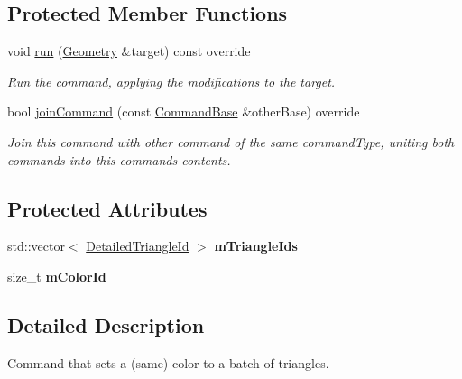 \subsection*{Protected Member Functions}
\begin{DoxyCompactItemize}
\item 
\mbox{\label{classpepr3d_1_1_cmd_paint_single_color_ab113e39f99d4763fa7a5b0d4839c06fc}} 
void \mbox{\hyperlink{classpepr3d_1_1_cmd_paint_single_color_ab113e39f99d4763fa7a5b0d4839c06fc}{run}} (\mbox{\hyperlink{classpepr3d_1_1_geometry}{Geometry}} \&target) const override
\begin{DoxyCompactList}\small\item\em Run the command, applying the modifications to the target. \end{DoxyCompactList}\item 
bool \mbox{\hyperlink{classpepr3d_1_1_cmd_paint_single_color_a99945a65b5efae3151ebdbae619f3eed}{join\+Command}} (const \mbox{\hyperlink{classpepr3d_1_1_command_base}{Command\+Base}} \&other\+Base) override
\begin{DoxyCompactList}\small\item\em Join this command with other command of the same command\+Type, uniting both commands into this command\textquotesingle{}s contents. \end{DoxyCompactList}\end{DoxyCompactItemize}
\subsection*{Protected Attributes}
\begin{DoxyCompactItemize}
\item 
\mbox{\label{classpepr3d_1_1_cmd_paint_single_color_a35c9fb01eb1b09c34441e7b77955fbe8}} 
std\+::vector$<$ \mbox{\hyperlink{structpepr3d_1_1_detailed_triangle_id}{Detailed\+Triangle\+Id}} $>$ {\bfseries m\+Triangle\+Ids}
\item 
\mbox{\label{classpepr3d_1_1_cmd_paint_single_color_ae9397951977c22f22ed343acd1316304}} 
size\+\_\+t {\bfseries m\+Color\+Id}
\end{DoxyCompactItemize}


\subsection{Detailed Description}
Command that sets a (same) color to a batch of triangles. 

